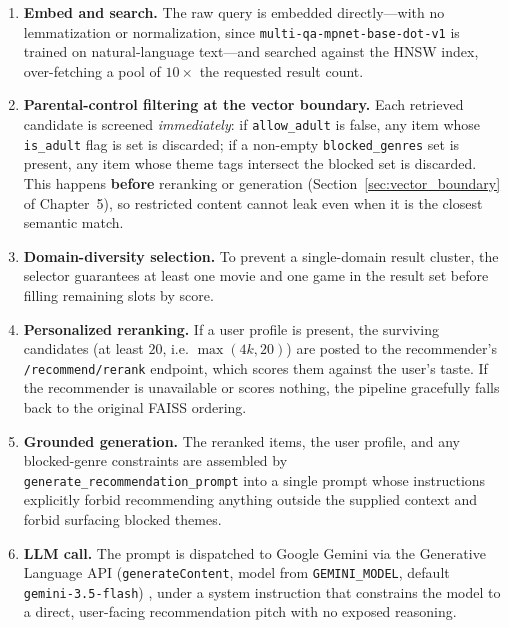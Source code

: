 \begin{enumerate}
    \item \textbf{Embed and search.} The raw query is embedded directly---with no lemmatization or normalization, since \texttt{multi-qa-mpnet-base-dot-v1} is trained on natural-language text---and searched against the HNSW index, over-fetching a pool of $10\times$ the requested result count.
    \item \textbf{Parental-control filtering at the vector boundary.} Each retrieved candidate is screened \emph{immediately}: if \texttt{allow\_adult} is false, any item whose \texttt{is\_adult} flag is set is discarded; if a non-empty \texttt{blocked\_genres} set is present, any item whose theme tags intersect the blocked set is discarded. This happens \textbf{before} reranking or generation (Section~\ref{sec:vector_boundary} of Chapter~5), so restricted content cannot leak even when it is the closest semantic match.
    \item \textbf{Domain-diversity selection.} To prevent a single-domain result cluster, the selector guarantees at least one movie and one game in the result set before filling remaining slots by score.
    \item \textbf{Personalized reranking.} If a user profile is present, the surviving candidates (at least $20$, i.e. $\max(4k, 20)$) are posted to the recommender's \texttt{/recommend/rerank} endpoint, which scores them against the user's taste. If the recommender is unavailable or scores nothing, the pipeline gracefully falls back to the original FAISS ordering.
    \item \textbf{Grounded generation.} The reranked items, the user profile, and any blocked-genre constraints are assembled by \texttt{generate\_\allowbreak recommendation\_\allowbreak prompt} into a single prompt whose instructions explicitly forbid recommending anything outside the supplied context and forbid surfacing blocked themes.
    \item \textbf{LLM call.} The prompt is dispatched to Google Gemini via the Generative Language API (\texttt{generateContent}, model from \texttt{GEMINI\_MODEL}, default \texttt{gemini-3.5-flash}) \cite{gemini_ref}, under a system instruction that constrains the model to a direct, user-facing recommendation pitch with no exposed reasoning.
\end{enumerate}

